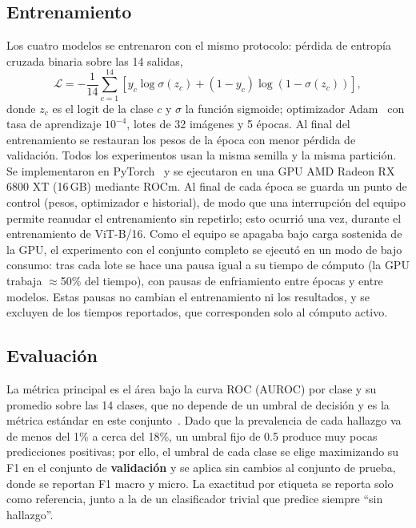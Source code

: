 \documentclass[conference]{IEEEtran}
\begin{document}
\subsection{Entrenamiento}
Los cuatro modelos se entrenaron con el mismo protocolo: pérdida de entropía cruzada binaria sobre las 14 salidas,
\begin{equation}
\mathcal{L} = -\frac{1}{14}\sum_{c=1}^{14}\left[y_c\log\sigma(z_c) + (1-y_c)\log\left(1-\sigma(z_c)\right)\right],
\end{equation}
donde $z_c$ es el logit de la clase $c$ y $\sigma$ la función sigmoide; optimizador Adam~\cite{kingma2015adam} con tasa de aprendizaje $10^{-4}$, lotes de 32 imágenes y 5 épocas. Al final del entrenamiento se restauran los pesos de la época con menor pérdida de validación. Todos los experimentos usan la misma semilla y la misma partición. Se implementaron en PyTorch~\cite{paszke2019pytorch} y se ejecutaron en una GPU AMD Radeon RX 6800 XT (16\,GB) mediante ROCm. Al final de cada época se guarda un punto de control (pesos, optimizador e historial), de modo que una interrupción del equipo permite reanudar el entrenamiento sin repetirlo; esto ocurrió una vez, durante el entrenamiento de ViT-B/16. Como el equipo se apagaba bajo carga sostenida de la GPU, el experimento con el conjunto completo se ejecutó en un modo de bajo consumo: tras cada lote se hace una pausa igual a su tiempo de cómputo (la GPU trabaja $\approx$50\% del tiempo), con pausas de enfriamiento entre épocas y entre modelos. Estas pausas no cambian el entrenamiento ni los resultados, y se excluyen de los tiempos reportados, que corresponden solo al cómputo activo.

\subsection{Evaluación}
\label{sec:evaluacion}
La métrica principal es el área bajo la curva ROC (AUROC) por clase y su promedio sobre las 14 clases, que no depende de un umbral de decisión y es la métrica estándar en este conjunto~\cite{wang2017chestxray,rajpurkar2017chexnet}. Dado que la prevalencia de cada hallazgo va de menos del 1\% a cerca del 18\%, un umbral fijo de 0.5 produce muy pocas predicciones positivas; por ello, el umbral de cada clase se elige maximizando su F1 en el conjunto de \textbf{validación} y se aplica sin cambios al conjunto de prueba, donde se reportan F1 macro y micro. La exactitud por etiqueta se reporta solo como referencia, junto a la de un clasificador trivial que predice siempre ``sin hallazgo''.
\end{document}

